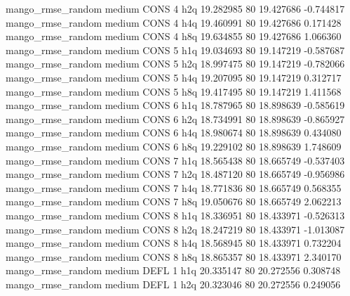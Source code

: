 mango_rmse_random     medium     CONS                 4                  h2q 19.282985 80      19.427686          -0.744817
mango_rmse_random     medium     CONS                 4                  h4q 19.460991 80      19.427686           0.171428
mango_rmse_random     medium     CONS                 4                  h8q 19.634855 80      19.427686           1.066360
mango_rmse_random     medium     CONS                 5                  h1q 19.034693 80      19.147219          -0.587687
mango_rmse_random     medium     CONS                 5                  h2q 18.997475 80      19.147219          -0.782066
mango_rmse_random     medium     CONS                 5                  h4q 19.207095 80      19.147219           0.312717
mango_rmse_random     medium     CONS                 5                  h8q 19.417495 80      19.147219           1.411568
mango_rmse_random     medium     CONS                 6                  h1q 18.787965 80      18.898639          -0.585619
mango_rmse_random     medium     CONS                 6                  h2q 18.734991 80      18.898639          -0.865927
mango_rmse_random     medium     CONS                 6                  h4q 18.980674 80      18.898639           0.434080
mango_rmse_random     medium     CONS                 6                  h8q 19.229102 80      18.898639           1.748609
mango_rmse_random     medium     CONS                 7                  h1q 18.565438 80      18.665749          -0.537403
mango_rmse_random     medium     CONS                 7                  h2q 18.487120 80      18.665749          -0.956986
mango_rmse_random     medium     CONS                 7                  h4q 18.771836 80      18.665749           0.568355
mango_rmse_random     medium     CONS                 7                  h8q 19.050676 80      18.665749           2.062213
mango_rmse_random     medium     CONS                 8                  h1q 18.336951 80      18.433971          -0.526313
mango_rmse_random     medium     CONS                 8                  h2q 18.247219 80      18.433971          -1.013087
mango_rmse_random     medium     CONS                 8                  h4q 18.568945 80      18.433971           0.732204
mango_rmse_random     medium     CONS                 8                  h8q 18.865357 80      18.433971           2.340170
mango_rmse_random     medium     DEFL                 1                  h1q 20.335147 80      20.272556           0.308748
mango_rmse_random     medium     DEFL                 1                  h2q 20.323046 80      20.272556           0.249056
